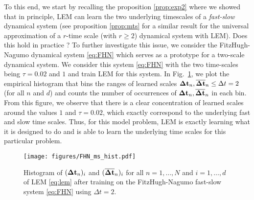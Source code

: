 \documentclass{article} \usepackage{iclr2022_conference,times}
\newcommand{\Dt}{{\Delta t}}
\newcommand{\fref}[1] {Fig.~\ref{#1}}
\begin{document}
To this end, we start by recalling the proposition \ref{prop:exp2} where we showed that in principle, LEM can learn the two underlying timescales of a \emph{fast-slow} dynamical system (see proposition \ref{prop:mts} for a similar result for the universal approximation of a $r$-time scale (with $r \geq 2$) dynamical system with LEM). Does this hold in practice ? To further investigate this issue, we consider the FitzHugh-Nagumo dynamical system \eqref{eq:FHN} which serves as a prototype for a two-scale dynamical system. We consider this system \eqref{eq:FHN} with the two time-scales being $\tau = 0.02$ and $1$ and train LEM for this system. In \fref{fig:FHN_ms_hist}, we plot the empirical histogram that bins the ranges of learned scales ${\bf \Dt}_n,\overline{\bf \Dt}_n \leq \Dt =2$ (for all $n$ and $d$) and counts the number of occurrences of ${\bf \Dt}_n,\overline{\bf \Dt}_n$ in each bin. From this figure, we observe that there is a clear concentration of learned scales around the values $1$ and $\tau = 0.02$, which exactly correspond to the underlying fast and slow time scales. Thus, for this model problem, LEM is exactly learning what it is designed to do and is able to learn the underlying time scales for this particular problem.
\begin{figure}[ht!]
\centering
\texttt{[image: figures/FHN\_ms\_hist.pdf]}
\caption{Histogram of $({\bf \Dt}_n)_i$ and $({\bf \overline{\Dt}}_n)_i$ for all $n=1,\dots,N$ and $i=1,\dots,d$ of LEM \eqref{eq:lem} after training on the FitzHugh-Nagumo fast-slow system \eqref{eq:FHN} using $\Dt=2$.}
\label{fig:FHN_ms_hist}
\end{figure}
\end{document}
